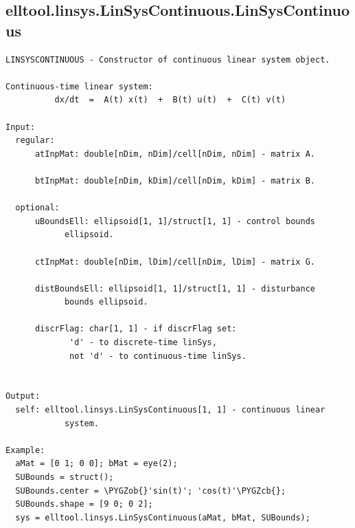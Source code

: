 \documentclass[letterpaper,10pt,english]{sphinxmanual}
\def\PYGZob{\char`\{}
\def\PYGZcb{\char`\}}
\begin{document}
\subsection{elltool.linsys.LinSysContinuous.LinSysContinuous}
\label{chap_functions:elltool-linsys-linsyscontinuous-linsyscontinuous}
\begin{Verbatim}[commandchars=\\\{\}]
LINSYSCONTINUOUS - Constructor of continuous linear system object.

Continuous-time linear system:
          dx/dt  =  A(t) x(t)  +  B(t) u(t)  +  C(t) v(t)

Input:
  regular:
      atInpMat: double[nDim, nDim]/cell[nDim, nDim] - matrix A.

      btInpMat: double[nDim, kDim]/cell[nDim, kDim] - matrix B.

  optional:
      uBoundsEll: ellipsoid[1, 1]/struct[1, 1] - control bounds
            ellipsoid.

      ctInpMat: double[nDim, lDim]/cell[nDim, lDim] - matrix G.

      distBoundsEll: ellipsoid[1, 1]/struct[1, 1] - disturbance
            bounds ellipsoid.

      discrFlag: char[1, 1] - if discrFlag set:
             'd' - to discrete-time linSys,
             not 'd' - to continuous-time linSys.


Output:
  self: elltool.linsys.LinSysContinuous[1, 1] - continuous linear
            system.

Example:
  aMat = [0 1; 0 0]; bMat = eye(2);
  SUBounds = struct();
  SUBounds.center = \PYGZob{}'sin(t)'; 'cos(t)'\PYGZcb{};
  SUBounds.shape = [9 0; 0 2];
  sys = elltool.linsys.LinSysContinuous(aMat, bMat, SUBounds);
\end{Verbatim}
\end{document}
